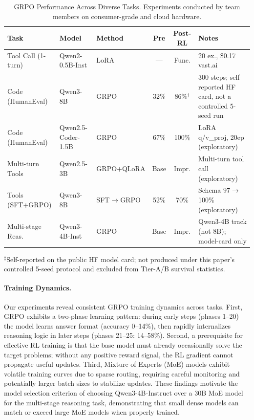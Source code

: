\documentclass{article}
\begin{document}
\begin{table}[t]
\centering
\caption{GRPO Performance Across Diverse Tasks. Experiments conducted by team members
on consumer-grade and cloud hardware.}
\label{tab:task_grpo}
\footnotesize
\begin{tabular}{@{}l l l c c p{2.8cm}@{}}
\toprule
\textbf{Task} & \textbf{Model} & \textbf{Method} & \textbf{Pre} & \textbf{Post-RL} & \textbf{Notes} \\
\midrule
Tool Call (1-turn) & Qwen2-0.5B-Inst & LoRA & --- & Func. & 20 ex., \$0.17 vast.ai \\
Code (HumanEval) & Qwen3-8B & GRPO & 32\% & 86\%$^{\ddagger}$ & 300 steps; self-reported HF card, not a controlled 5-seed run \\
Code (HumanEval) & Qwen2.5-Coder-1.5B & GRPO & 67\% & 100\% & LoRA q/v\_proj, 20ep (exploratory) \\
Multi-turn Tools & Qwen2.5-3B & GRPO+QLoRA & Base & Impr. & Multi-turn tool call (exploratory) \\
Tools (SFT+GRPO) & Qwen3-8B & SFT$\to$GRPO & 52\% & 70\% & Schema 97$\to$100\% (exploratory) \\
Multi-stage Reas. & Qwen3-4B-Inst & GRPO & Base & Impr. & Qwen3-4B track (not 8B); model-card only \\
\bottomrule
\end{tabular}

\vspace{2pt}
{\scriptsize $^{\ddagger}$Self-reported on the public HF model card; not produced under this paper's controlled 5-seed protocol and excluded from Tier-A/B survival statistics.}

\end{table}

\paragraph{Training Dynamics.}
Our experiments reveal consistent GRPO training dynamics across tasks.
First, GRPO exhibits a two-phase learning pattern: during early steps (phases
1--20) the model learns answer format (accuracy 0--14\%), then rapidly
internalizes reasoning logic in later steps (phases 21--25: 14--58\%).
Second, a prerequisite for effective RL training is that the base model must
already occasionally solve the target problems; without any positive reward
signal, the RL gradient cannot propagate useful updates. Third, Mixture-of-Experts
(MoE) models exhibit volatile training curves due to sparse routing, requiring
careful monitoring and potentially larger batch sizes to stabilize updates.
These findings motivate the model selection criterion of choosing Qwen3-4B-Instruct
over a 30B MoE model for the multi-stage reasoning task, demonstrating that
small dense models can match or exceed large MoE models when properly trained.
\end{document}
